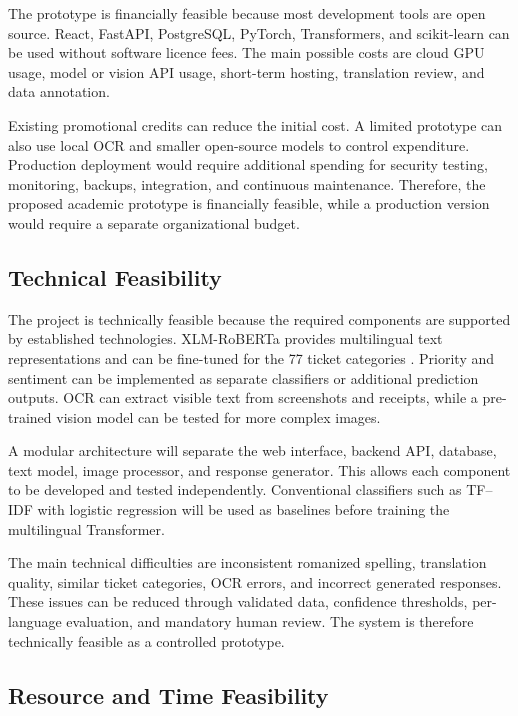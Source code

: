 \documentclass[11pt,a4paper]{article}
\begin{document}
The prototype is financially feasible because most development tools are open source. React, FastAPI, PostgreSQL, PyTorch, Transformers, and scikit-learn can be used without software licence fees. The main possible costs are cloud GPU usage, model or vision API usage, short-term hosting, translation review, and data annotation.

Existing promotional credits can reduce the initial cost. A limited prototype can also use local OCR and smaller open-source models to control expenditure. Production deployment would require additional spending for security testing, monitoring, backups, integration, and continuous maintenance. Therefore, the proposed academic prototype is financially feasible, while a production version would require a separate organizational budget.

\subsection{Technical Feasibility}

The project is technically feasible because the required components are supported by established technologies. XLM-RoBERTa provides multilingual text representations and can be fine-tuned for the 77 ticket categories \cite{xlmr}. Priority and sentiment can be implemented as separate classifiers or additional prediction outputs. OCR can extract visible text from screenshots and receipts, while a pre-trained vision model can be tested for more complex images.

A modular architecture will separate the web interface, backend API, database, text model, image processor, and response generator. This allows each component to be developed and tested independently. Conventional classifiers such as TF--IDF with logistic regression will be used as baselines before training the multilingual Transformer.

The main technical difficulties are inconsistent romanized spelling, translation quality, similar ticket categories, OCR errors, and incorrect generated responses. These issues can be reduced through validated data, confidence thresholds, per-language evaluation, and mandatory human review. The system is therefore technically feasible as a controlled prototype.

\subsection{Resource and Time Feasibility}
\end{document}
